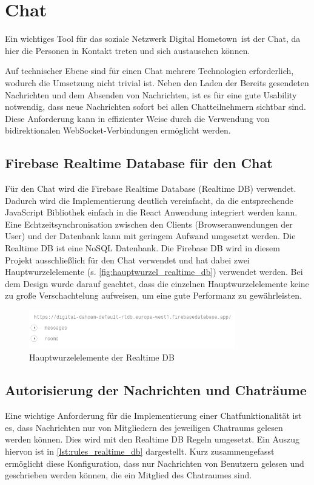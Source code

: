 \section{Chat}
\label{sec:chat}

Ein wichtiges Tool für das soziale Netzwerk \glqq Digital Hometown\grqq \ ist der Chat, da hier die Personen in Kontakt treten und sich austauschen können.

Auf technischer Ebene sind für einen Chat mehrere Technologien erforderlich, wodurch die Umsetzung nicht trivial ist. Neben den Laden der Bereits gesendeten Nachrichten und dem Absenden von Nachrichten, ist es für eine gute Usability notwendig, dass neue Nachrichten sofort bei allen Chatteilnehmern sichtbar sind. Diese Anforderung kann in effizienter Weise durch die Verwendung von bidirektionalen WebSocket-Verbindungen ermöglicht werden.

\subsection{Firebase Realtime Database für den Chat}
\label{sec:firebase_realtime_db_chat}

Für den Chat wird die Firebase Realtime Database (Realtime DB) verwendet. Dadurch wird die Implementierung deutlich vereinfacht, da die entsprechende JavaScript Bibliothek einfach in die React Anwendung integriert werden kann. Eine Echtzeitsynchronisation zwischen den Clients (Browseranwendungen der User) und der Datenbank kann mit geringem Aufwand umgesetzt werden. Die Realtime DB ist eine NoSQL Datenbank.
Die Firebase DB wird in diesem Projekt ausschließlich für den Chat verwendet und hat dabei zwei Hauptwurzelelemente (s. \autoref{fig:hauptwurzel_realtime_db}) verwendet werden. Bei dem Design wurde darauf geachtet, dass die einzelnen Hauptwurzelelemente keine zu große Verschachtelung aufweisen, um eine gute Performanz zu gewährleisten.

\begin{figure}[!htb]
    \centering
    \includegraphics[width=0.8\textwidth]{figures/boas/21_hauptwurzel_realtime_db.png}
    \caption[]{Hauptwurzelelemente der Realtime DB}
    \label{fig:hauptwurzel_realtime_db}
\end{figure}


\subsection{Autorisierung der Nachrichten und Chaträume}
\label{sec:autorisierung_chat}
Eine wichtige Anforderung für die Implementierung einer Chatfunktionalität ist es, dass Nachrichten nur von Mitgliedern des jeweiligen Chatraums gelesen werden können. Dies wird mit den Realtime DB Regeln umgesetzt. Ein Auszug hiervon ist in \autoref{lst:rules_realtime_db} dargestellt. Kurz zusammengefasst ermöglicht diese Konfiguration, dass nur Nachrichten von Benutzern gelesen und geschrieben werden können, die ein Mitglied des Chatraumes sind.

